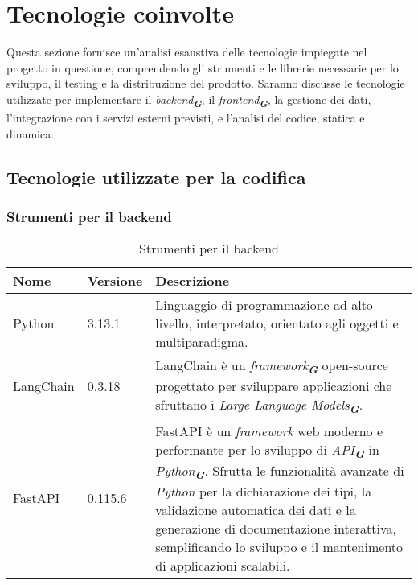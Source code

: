 
\section{Tecnologie coinvolte}
\label{sec:tecnologie_coinvolte}

Questa sezione fornisce un’analisi esaustiva delle tecnologie impiegate nel progetto in questione, comprendendo gli
strumenti e le librerie necessarie per lo sviluppo, il testing e la distribuzione del prodotto. Saranno discusse le tecnologie
utilizzate per implementare il \emph{backend}\textsubscript{\textbf{\textit{G}}}, il \emph{frontend}\textsubscript{\textbf{\textit{G}}},
la gestione dei dati, l’integrazione con i servizi esterni previsti, e l'analisi del codice, statica e dinamica.


\subsection{Tecnologie utilizzate per la codifica}

\subsubsection{Strumenti per il backend}
\label{subsec:strumenti_backend}
\begin{table}[h!]
    \centering
    \renewcommand{\arraystretch}{1.6} %
    \begin{tabularx}{\textwidth}{|p{2cm}|p{2cm}|X|} \hline
    \rowcolor[HTML]{FFD700} 
    \textbf{Nome} & \textbf{Versione} & \textbf{Descrizione} \\ 
    \hline
    Python & 3.13.1 & Linguaggio di programmazione ad alto livello, interpretato,
    orientato agli oggetti e multiparadigma. \\ 
    \hline
    LangChain & 0.3.18 & LangChain è un \emph{framework}\textsubscript{\textbf{\textit{G}}} open-source progettato per sviluppare
    applicazioni che sfruttano i \emph{Large Language Models}\textsubscript{\textbf{\textit{G}}}. \\ 
    \hline
    FastAPI & 0.115.6 & FastAPI è un \emph{framework} web moderno e performante per lo sviluppo di \emph{API}\textsubscript{\textbf{\textit{G}}} in \emph{Python}\textsubscript{\textbf{\textit{G}}}. 
    Sfrutta le funzionalità avanzate di \emph{Python} per la dichiarazione dei tipi, la validazione automatica dei dati e la generazione di documentazione interattiva, semplificando lo sviluppo e il mantenimento di applicazioni scalabili. \\ 
    \hline
    \end{tabularx}
    \caption{Strumenti per il backend}
\end{table}

